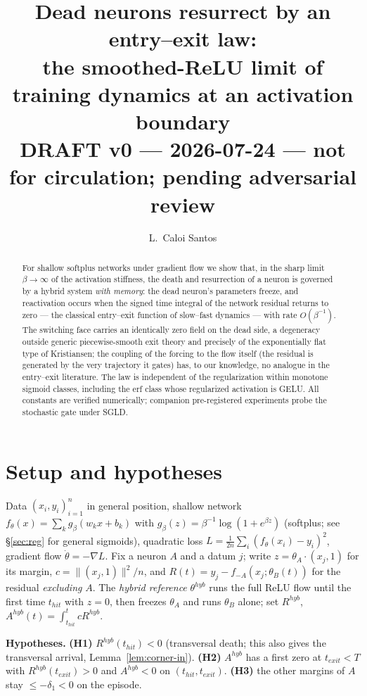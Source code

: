 \documentclass[11pt]{article}
\title{Dead neurons resurrect by an entry--exit law:\\ the smoothed-ReLU limit of
training dynamics at an activation boundary\\ \large DRAFT v0 --- 2026-07-24 ---
not for circulation; pending adversarial review}
\author{L.~Caloi Santos}
\date{}
\begin{document}
\maketitle

\begin{abstract}
For shallow softplus networks under gradient flow we show that, in the sharp
limit $\beta\to\infty$ of the activation stiffness, the death and resurrection
of a neuron is governed by a hybrid system \emph{with memory}: the dead
neuron's parameters freeze, and reactivation occurs when the signed time
integral of the network residual returns to zero --- the classical entry--exit
function of slow--fast dynamics --- with rate $O(\beta^{-1})$. The switching
face carries an identically zero field on the dead side, a degeneracy outside
generic piecewise-smooth exit theory and precisely of the exponentially flat
type of Kristiansen; the coupling of the forcing to the flow itself
(the residual is generated by the very trajectory it gates) has, to our
knowledge, no analogue in the entry--exit literature. The law is independent
of the regularization within monotone sigmoid classes, including the erf class
whose regularized activation is GELU. All constants are verified numerically;
companion pre-registered experiments probe the stochastic gate under SGLD.
\end{abstract}

\section{Setup and hypotheses}
Data $(x_i,y_i)_{i=1}^n$ in general position, shallow network
$f_\theta(x)=\sum_k g_\beta(w_kx+b_k)$ with $g_\beta(z)=\beta^{-1}\log(1+e^{\beta z})$
(softplus; see \S\ref{sec:reg} for general sigmoids), quadratic loss
$L=\tfrac1{2n}\sum_i(f_\theta(x_i)-y_i)^2$, gradient flow $\dot\theta=-\nabla L$.
Fix a neuron $A$ and a datum $j$; write $z=\theta_A\cdot(x_j,1)$ for its margin,
$c=\|(x_j,1)\|^2/n$, and $R(t)=y_j-f_{-A}(x_j;\theta_B(t))$ for the residual
\emph{excluding} $A$. The \emph{hybrid reference} $\theta^{hyb}$ runs the full
ReLU flow until the first time $t_{hit}$ with $z=0$, then freezes $\theta_A$ and
runs $\theta_B$ alone; set $R^{hyb}$, $A^{hyb}(t)=\int_{t_{hit}}^t cR^{hyb}$.

\smallskip\noindent\textbf{Hypotheses.}
\textbf{(H1)} $R^{hyb}(t_{hit})<0$ (transversal death; this also gives the
transversal arrival, Lemma~\ref{lem:corner-in}).
\textbf{(H2)} $A^{hyb}$ has a first zero at $t_{exit}<T$ with
$R^{hyb}(t_{exit})>0$ and $A^{hyb}<0$ on $(t_{hit},t_{exit})$.
\textbf{(H3)} the other margins of $A$ stay $\le-\delta_1<0$ on the episode.
\end{document}
